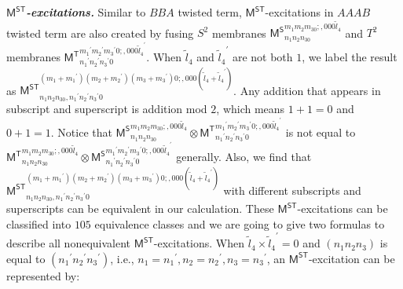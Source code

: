 \documentclass[11pt,nofootinbib,preprint]{revtex4-1}
\begin{document}
\textbf{\textit{$\mathsf{M^{ST}}$-excitations.}}
Similar to $BBA$ twisted term, $\mathsf{M^{ST}}$-excitations in $AAAB$ twisted term are also created by fusing $S^2$ membranes $\mathsf{M^S}_{n_1n_2n_30}^{m_1m_2m_30;,000\tilde{l}_4}$ and $T^2$ membranes $\mathsf{M^T}_{{n_1}^{\prime}{n_2}^{\prime}{n_3}^{\prime}0}^{{m_1}^{\prime}{m_2}^{\prime}{m_3}^{\prime}0;,000{\tilde{l}_4}^{\prime}}$. When $\tilde{l}_4$ and ${\tilde{l}_4}^{\prime}$ are not both $1$, we label the result as ${\mathsf{M}^{\mathsf{ST}}}_{n_1n_2n_30,{n_1}^{\prime}{n_2}^{\prime}{n_3}^{\prime}0}^{\left( m_1+{m_1}^{\prime} \right) \left( m_2+{m_2}^{\prime} \right) \left( m_3+{m_3}^{\prime} \right) 0;,000\left( \tilde{l}_4+{\tilde{l}_4}^{\prime} \right)}$. Any addition that appears in subscript and superscript is addition mod $2$, which means $1+1=0$ and $0+1=1$. Notice that ${\mathsf{M}^{\mathsf{S}}}_{n_1n_2n_30}^{m_1m_2m_30;,000\tilde{l}_4}\otimes {\mathsf{M}^{\mathsf{T}}}_{{n_1}^{\prime}{n_2}^{\prime}{n_3}^{\prime}0}^{{m_1}^{\prime}{m_2}^{\prime}{m_3}^{\prime}0;,000{\tilde{l}_4}^{\prime}}$ is not equal to ${\mathsf{M}^{\mathsf{T}}}_{n_1n_2n_30}^{m_1m_2m_30;,000\tilde{l}_4}\otimes {\mathsf{M}^{\mathsf{S}}}_{{n_1}^{\prime}{n_2}^{\prime}{n_3}^{\prime}0}^{{m_1}^{\prime}{m_2}^{\prime}{m_3}^{\prime}0;,000{\tilde{l}_4}^{\prime}}$ generally. Also, we find that ${\mathsf{M}^{\mathsf{ST}}}_{n_1n_2n_30,{n_1}^{\prime}{n_2}^{\prime}{n_3}^{\prime}0}^{\left( m_1+{m_1}^{\prime} \right) \left( m_2+{m_2}^{\prime} \right) \left( m_3+{m_3}^{\prime} \right) 0;,000\left( \tilde{l}_4+{\tilde{l}_4}^{\prime} \right)}$ with different subscripts and superscripts can be equivalent in our calculation. These $\mathsf{M^{ST}}$-excitations can be classified into $105$ equivalence classes and we are going to give two formulas to describe all nonequivalent $\mathsf{M^{ST}}$-excitations. When $\tilde{l}_4\times{\tilde{l}_4}^{\prime}=0$ and $\left(n_1n_2n_3\right)$ is equal to $\left({n_1}^{\prime}{n_2}^{\prime}{n_3}^{\prime}\right)$, i.e., $n_1={n_1}^{\prime},n_2={n_2}^{\prime},n_3={n_3}^{\prime}$, an $\mathsf{M^{ST}}$-excitation can be represented by:
\end{document}
